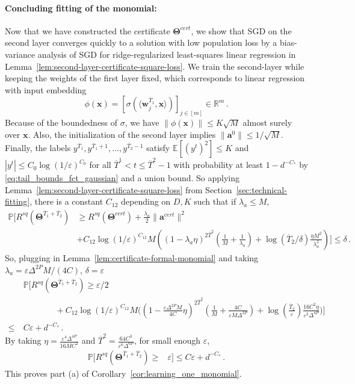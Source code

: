 \documentclass[11pt]{article}
\renewcommand{\P}{\mathbb{P}}
\newcommand{\E}{\mathbb{E}}
\newcommand{\R}{\mathbb{R}}
\newcommand{\eps}{\varepsilon}
\newcommand{\<}{\langle}
\renewcommand{\>}{\rangle}
\theoremstyle{definition}
\def\ba{{\boldsymbol a}}
\def\bw{{\boldsymbol w}}
\def\bx{{\boldsymbol x}}
\def\bTheta{{\boldsymbol \Theta}}
\def\bTheta{{\boldsymbol \Theta}}
\def\bw{{\boldsymbol w}}
\def\bx{{\boldsymbol x}}
\def\ba{{\boldsymbol a}}
\def\bTheta{{\boldsymbol \Theta}}
\def\eps{\varepsilon}
\def\oT{\overline{T}}
\begin{document}
\paragraph*{Concluding fitting of the monomial:} Now that we have constructed the certificate $\bTheta^{cert}$, we 
show that SGD on the second layer converges quickly to a solution with low population loss by a bias-variance analysis of SGD for ridge-regularized least-squares linear regression in Lemma~\ref{lem:second-layer-certificate-square-loss}. We train the second-layer while keeping the weights of the first layer fixed, which corresponds to linear regression with input embedding $$\phi(\bx) = [\sigma(\<\bw_{j}^{\oT_1},\bx\>)]_{j \in [m]} \in \R^m\,.$$
Because of the boundedness of $\sigma$, we have $\|\phi(\bx)\| \leq K \sqrt{M}$ almost surely over $\bx$. Also, the initialization of the second layer implies $\|\ba^0\| \leq 1 / \sqrt{M}$. Finally, the labels $y^{\oT_1},y^{\oT_1+1},\ldots,y^{\oT_2-1}$ satisfy $\E[(y^t)^2] \leq K$ and $|y^t| \leq C_0 \log(1/\eps)^{C_0}$ for all $\oT^1 < t \leq \oT^2-1$ with probability at least $1 - d^{-C_*}$ by \eqref{eq:tail_bounds_fct_gaussian} and a union bound. So applying Lemma~\ref{lem:second-layer-certificate-square-loss} from Section~\ref{sec:technical-fitting}, there is a constant $C_{12}$ depending on $D,K$ such that if $\lambda_a \leq M$,
\begin{equation}\label{eq:second-layer-fitting-square-loss-monomial}
\begin{aligned}
\P\Big[R^{sq}(\bTheta^{\oT_1 + \oT_2})& \geq R^{sq}(\bTheta^{cert}) + \frac{\lambda_a}{2} \|\ba^{cert}\|^2  \nonumber \\
&+ C_{12}\log(1/\eps)^{C_{12}} M\left((1-\lambda_a \eta)^{2\oT^2} (\frac{1}{M} + \frac{1}{\lambda_a}) + \log(\oT_2 / \delta) \frac{\eta M^2}{\lambda_a^2}\right)\Big] \leq \delta \,. 
\end{aligned}
\end{equation}
So, plugging in Lemma~\ref{lem:certificate-formal-monomial} and taking $\lambda_a = \eps \Delta^{2P} M / (4C)$, $\delta = \eps$
\begin{align*}
&~\P\Big[R^{sq}(\bTheta^{\oT_1 + \oT_2}) \geq \eps /2 \\
&\qquad \qquad + C_{12}\log(1/\eps)^{C_{12}} M \Big((1-\frac{\eps \Delta^{2P}M}{4C}\eta)^{2\oT^2} (\frac{1}{M} + \frac{4C}{\eps M\Delta^{2P}}) + \log(\frac{\oT_2}{\eps}) \frac{16C^2\eta}{\eps^2 \Delta^{4P}}\Big)\Big] \\ \leq&~ C\eps + d^{-C_*}\,. 
\end{align*}
By taking $\eta = \frac{\eps^4 \Delta^{4P}}{16MC^2}$ and $\oT^2 = \frac{64C^3}{\eps^6 \Delta^{6P}}$, for small enough $\eps$,
\begin{align*}
\P\Big[R^{sq}(\bTheta^{\oT_1 + \oT_2}) \geq & \eps \Big] \leq C\eps + d^{-C_*}\,. 
\end{align*}
This proves part (a) of Corollary~\ref{cor:learning_one_monomial}.
\end{document}
